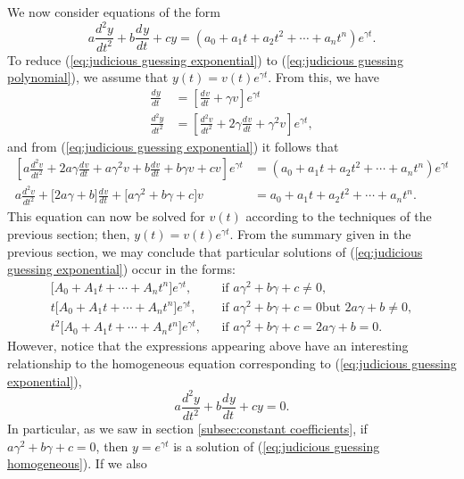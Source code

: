\documentclass{myart}
\newcommand{\eq}[1]{(\ref{eq:#1})}
\newcommand{\deriv}[3][]{\frac{d^{#1}#2}{d#3^{#1}}}
\begin{document}
We now consider equations of the form
\begin{equation} \label{eq:judicious guessing exponential}
    a \deriv[2]{y}{t} + b \deriv{y}{t} + cy
  = (a_0 + a_1t + a_2t^2 + \cdots + a_nt^n)e^{\gamma t}.
\end{equation}
To reduce \eq{judicious guessing exponential} to \eq{judicious
  guessing polynomial}, we assume that $y(t) = v(t) e^{\gamma t}$.
From this, we have
\begin{align*}
     \deriv{y}{t}
  &= \left[\deriv{v}{t} + \gamma v\right] e^{\gamma t} \\
     \deriv[2]{y}{t}
  &= \left[\deriv[2]{v}{t} + 2\gamma \deriv{v}{t}
                           + \gamma^2 v\right] e^{\gamma t},
\end{align*}
and from \eq{judicious guessing exponential} it follows that
\begin{align*}
     \left[a \deriv[2]{v}{t}
   + 2a\gamma \deriv{v}{t}
   + a\gamma^2 v
   + b \deriv{v}{t}
   + b\gamma v
   + cv\right] e^{\gamma t}
  &= (a_0 + a_1t + a_2t^2 + \cdots + a_nt^n)e^{\gamma t} \\
     a \deriv[2]{v}{t}
   + \big[2a\gamma
   + b\big] \deriv{v}{t}
   + \big[a\gamma^2
   + b\gamma
   + c\big] v
  &= a_0 + a_1t + a_2t^2 + \cdots + a_nt^n.
\end{align*}
This equation can now be solved for $v(t)$ according to the techniques
of the previous section; then, $y(t) = v(t)e^{\gamma t}$. From the
summary given in the previous section, we may conclude that particular
solutions of \eq{judicious guessing exponential} occur in the forms:
\begin{align*}
        \Big[A_0 + A_1t + \cdots + A_nt^n\Big] e^{\gamma t},
  && \text{if $a\gamma^2 + b\gamma + c \neq 0$}, \\
     t  \Big[A_0 + A_1t + \cdots + A_nt^n\Big] e^{\gamma t},
  && \text{if $a\gamma^2 + b\gamma + c = 0$
           but $2a\gamma + b \neq 0$}, \\
     t^2\Big[A_0 + A_1t + \cdots + A_nt^n\Big] e^{\gamma t},
  && \text{if $a\gamma^2 + b\gamma + c = 2a\gamma + b = 0$}.
\end{align*}
However, notice that the expressions appearing above have an
interesting relationship to the homogeneous equation corresponding to
\eq{judicious guessing exponential},
\begin{equation} \label{eq:judicious guessing homogeneous}
  a \deriv[2]{y}{t} + b \deriv{y}{t} + cy = 0.
\end{equation}
In particular, as we saw in section \ref{subsec:constant
  coefficients}, if $a\gamma^2 + b\gamma + c = 0$, then $y = e^{\gamma
  t}$ is a solution of \eq{judicious guessing homogeneous}. If we also
\end{document}
